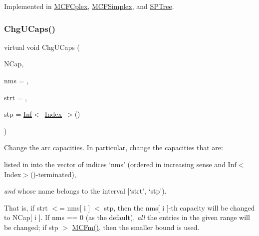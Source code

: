 Implemented in \mbox{\hyperlink{class_m_c_f_cplex_a00e86718fdd12d417a945d7e146d5b4d}{M\+C\+F\+Cplex}}, \mbox{\hyperlink{class_m_c_f_simplex_a00e86718fdd12d417a945d7e146d5b4d}{M\+C\+F\+Simplex}}, and \mbox{\hyperlink{class_s_p_tree_a00e86718fdd12d417a945d7e146d5b4d}{S\+P\+Tree}}.

\mbox{\label{class_m_c_f_class_ad548db90d9914f8a40bbb4823f274ccc}} 
\subsubsection{\texorpdfstring{Chg\+U\+Caps()}{ChgUCaps()}}
{\footnotesize\ttfamily virtual void Chg\+U\+Caps (\begin{DoxyParamCaption}\item[{\mbox{\hyperlink{class_m_c_f_class_ad325f3193dbba0ddef1da4e72d29eda6}{c\+F\+Row}}}]{N\+Cap,  }\item[{\mbox{\hyperlink{class_m_c_f_class_a81575b2d4e4d5636b17170432150ae69}{c\+Index\+\_\+\+Set}}}]{nms = {},  }\item[{\mbox{\hyperlink{class_m_c_f_class_a76aaabb20535c51a2752b93f6c38fe54}{c\+Index}}}]{strt = {},  }\item[{\mbox{\hyperlink{class_m_c_f_class_ad53d6229d7ec28555a9c9c2fd9abf773}{Index}}}]{stp = {\ttfamily \mbox{\hyperlink{class_o_p_ttypes__di__unipi__it_1_1_inf}{Inf}}$<$~\mbox{\hyperlink{class_m_c_f_class_ad53d6229d7ec28555a9c9c2fd9abf773}{Index}}~$>$()} }\end{DoxyParamCaption})\hspace{0.3cm}{\ttfamily [pure virtual]}}

Change the arc capacities. In particular, change the capacities that are\+:


\begin{DoxyItemize}
\item listed in into the vector of indices `nms' (ordered in increasing sense and Inf$<$\+Index$>$()-\/terminated),
\item {\itshape and} whose name belongs to the interval \mbox{[}`strt', `stp').
\end{DoxyItemize}

That is, if strt $<$= nms\mbox{[} i \mbox{]} $<$ stp, then the nms\mbox{[} i \mbox{]}-\/th capacity will be changed to N\+Cap\mbox{[} i \mbox{]}. If nms == 0 (as the default), {\itshape all} the entries in the given range will be changed; if stp $>$ \mbox{\hyperlink{class_m_c_f_class_ab4d5a0d0fc49882de0b4eb3146f1b7a6}{M\+C\+Fm()}}, then the smaller bound is used.

